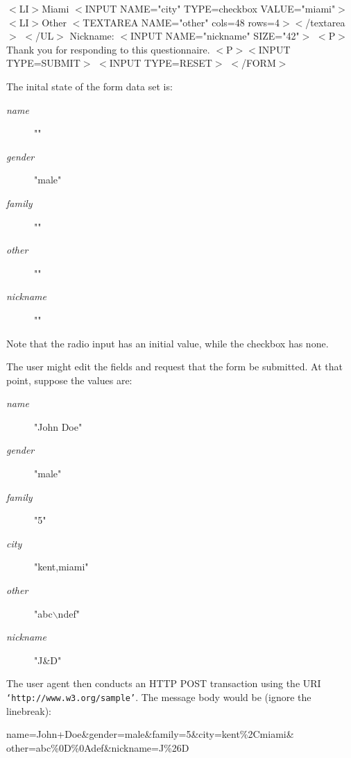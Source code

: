 $<$LI$>$Miami $<$INPUT NAME="city" TYPE=checkbox VALUE="miami"$>$
$<$LI$>$Other $<$TEXTAREA NAME="other" cols=48 rows=4$>$$<$/textarea$>$
$<$/UL$>$
Nickname: $<$INPUT NAME="nickname" SIZE="42"$>$
$<$P$>$Thank you for responding to this questionnaire.
$<$P$>$$<$INPUT TYPE=SUBMIT$>$ $<$INPUT TYPE=RESET$>$
$<$/FORM$>$
\par 
The inital state of the form data set is:
\par \begin{description}\item[{\it name}]
""
\item[{\it gender}]
"male"
\item[{\it family}]
""
\item[{\it other}]
""
\item[{\it nickname}]
""
\end{description}\par 
Note that the radio input has an initial value, while the checkbox
has none.
\par \par 
The user might edit the fields and request that the form be
submitted.  At that point, suppose the values are:
\par \begin{description}\item[{\it name}]
"John Doe"
\item[{\it gender}]
"male"
\item[{\it family}]
"5"
\item[{\it city}]
"kent,miami"
\item[{\it other}]
"abc$\backslash$ndef"
\item[{\it nickname}]
"J\&D"
\end{description}\par 
The user agent then conducts an HTTP POST transaction using the URI
{\tt `http://www.w3.org/sample'}.  The message body would be (ignore
the linebreak):
\par name=John+Doe\&gender=male\&family=5\&city=kent\%2Cmiami\&
other=abc\%0D\%0Adef\&nickname=J\%26D
